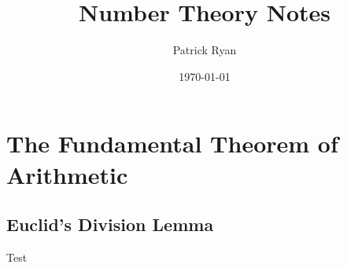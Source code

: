 \documentclass[a4paper]{book}
\title{Number Theory Notes}
\date{\today}
\author{Patrick Ryan}
\begin{document}
\maketitle

\chapter{The Fundamental Theorem of Arithmetic}

\section{Euclid's Division Lemma}

Test
\end{document}
